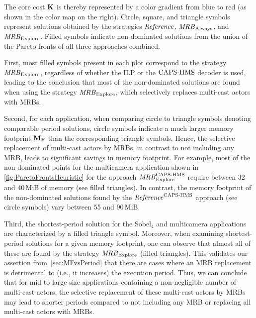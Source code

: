 The core cost $\mathbf{K}$ is thereby represented by a color gradient from blue to red (as shown in the color map on the right).
Circle, square, and triangle symbols represent solutions obtained by the strategies ${\it Reference}$, ${\it MRB}_{\mathrm{Always}}$, and ${\it MRB}_{\mathrm{Explore}}$.
Filled symbols indicate non-dominated solutions from the union of the Pareto fronts of all three approaches combined.
\par
\KeyObservation
First, most filled symbols present in each plot correspond to the strategy ${\it MRB}_{\mathrm{Explore}}$, regardless of whether the \ac{ILP} or the $\textup{{CAPS-HMS}}$ decoder is used, leading to the conclusion that most of the non-dominated solutions are found when using the strategy ${\it MRB}_{\mathrm{Explore}}$, which selectively replaces multi-cast actors with \acp{MRB}.
\par
Second, for each application, when comparing circle to triangle symbols denoting comparable period solutions, circle symbols indicate a much larger memory footprint $\mathbf{M_F}$ than the corresponding triangle symbols.
Hence, the selective replacement of multi-cast actors by \acp{MRB}, in contrast to not including any \ac{MRB}, leads to significant savings in memory footprint.
For example, most of the non-dominated points for the multicamera application shown in \cref{fig:ParetoFrontsHeuristic} for the approach ${\it MRB}_{\mathrm{Explore}}^{\textup{{CAPS-HMS}}}$ require between 32 and 40\,MiB of memory (see filled triangles).
In contrast, the memory footprint of the non-dominated solutions found by the ${\it Reference}^{\textup{{CAPS-HMS}}}$ approach (see circle symbols) vary between 55 and 90\,MiB.
\par
Third, the shortest-period solution for the Sobel$_4$ and multicamera applications are characterized by a filled triangle symbol. %
Moreover, when examining shortest-period solutions for a given memory footprint, one can observe that almost all of these are found by the strategy ${\it MRB}_{\mathrm{Explore}}$ (filled triangles).
This validates our assertion from~\cref{sec:MFvsPeriod} that there are cases where an \ac{MRB} replacement is detrimental to (i.e., it increases) the execution period.
Thus, we can conclude that for mid to large size applications containing a non-negligible number of multi-cast actors, the selective replacement of these multi-cast actors by \acp{MRB} may lead to shorter periods compared to not including any \ac{MRB} or replacing all multi-cast actors with \acp{MRB}.

